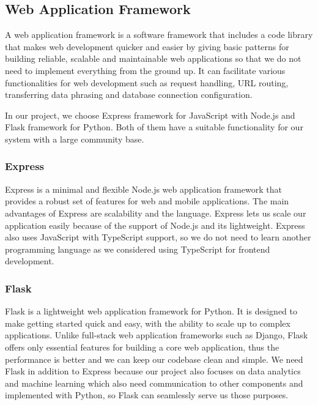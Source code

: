 \documentclass[12pt,oneside,openright,a4paper]{cpe-english-project}
\begin{document}
\subsection{Web Application Framework}

A web application framework is a software framework that includes a code library that makes web development quicker and easier by giving basic patterns for building reliable, scalable and maintainable web applications \cite{WhatIsWebFramework} so that we do not need to implement everything from the ground up. It can facilitate various functionalities for web development such as request handling, URL routing, transferring data phrasing and database connection configuration.

In our project, we choose Express framework for JavaScript with Node.js and Flask framework for Python. Both of them have a suitable functionality for our system with a large community base. 

\subsubsection{Express}

Express is a minimal and flexible Node.js web application framework that provides a robust set of features for web and mobile applications. \cite{Express} The main advantages of Express are scalability and the language. Express lets us scale our application easily because of the support of Node.js and its lightweight. Express also uses JavaScript with TypeScript support, so we do not need to learn another programming language as we considered using TypeScript for frontend development.

\subsubsection{Flask}

Flask is a lightweight web application framework for Python. It is designed to make getting started quick and easy, with the ability to scale up to complex applications. \cite{Flask} Unlike full-stack web application frameworks such as Django, Flask offers only essential features for building a core web application, thus the performance is better and we can keep our codebase clean and simple. We need Flask in addition to Express because our project also focuses on data analytics and machine learning which also need communication to other components and implemented with Python, so Flask can seamlessly serve us those purposes.
\end{document}
